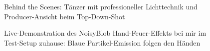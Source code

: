 \begin{figure}[htbp]
    \centering
    \caption{Behind the Scenes: Tänzer mit professioneller Lichttechnik und Producer-Ansicht beim Top-Down-Shot}
    \label{fig:studio_wide}
\end{figure}

\FloatBarrier

\begin{figure}[htbp]
    \centering
    \caption{Live-Demonstration des NoisyBlob Hand-Feuer-Effekts bei mir im Test-Setup zuhause: Blaue Partikel-Emission folgen den Händen}
    \label{fig:handfeuer_demonstration}
\end{figure}

